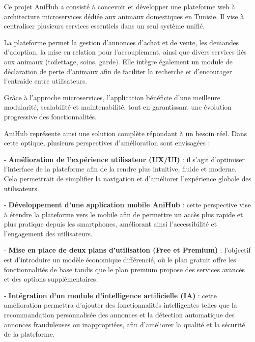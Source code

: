 Ce projet AniHub a consisté à concevoir et développer une plateforme web à architecture microservices dédiée aux animaux domestiques en Tunisie. Il vise à centraliser plusieurs services essentiels dans un seul système unifié.

La plateforme permet la gestion d’annonces d’achat et de vente, les demandes d’adoption, la mise en relation pour l’accouplement, ainsi que divers services liés aux animaux (toilettage, soins, garde). Elle intègre également un module de déclaration de perte d’animaux afin de faciliter la recherche et d’encourager l’entraide entre utilisateurs.

Grâce à l’approche microservices, l’application bénéficie d’une meilleure modularité, scalabilité et maintenabilité, tout en garantissant une évolution progressive des fonctionnalités.

AniHub représente ainsi une solution complète répondant à un besoin réel. \newline
Dans cette optique, plusieurs perspectives d’amélioration sont envisagées :

- \textbf{Amélioration de l’expérience utilisateur (UX/UI)} : il s’agit d’optimiser l’interface de la plateforme afin de la rendre plus intuitive, fluide et moderne. Cela permettrait de simplifier la navigation et d’améliorer l’expérience globale des utilisateurs.

- \textbf{Développement d’une application mobile AniHub} : cette perspective vise à étendre la plateforme vers le mobile afin de permettre un accès plus rapide et plus pratique depuis les smartphones, améliorant ainsi l’accessibilité et l’engagement des utilisateurs.

- \textbf{Mise en place de deux plans d’utilisation (Free et Premium)} : l’objectif est d’introduire un modèle économique différencié, où le plan gratuit offre les fonctionnalités de base tandis que le plan premium propose des services avancés et des options supplémentaires.

- \textbf{Intégration d’un module d’intelligence artificielle (IA)} : cette amélioration permettra d’ajouter des fonctionnalités intelligentes telles que la recommandation personnalisée des annonces et la détection automatique des annonces frauduleuses ou inappropriées, afin d’améliorer la qualité et la sécurité de la plateforme.